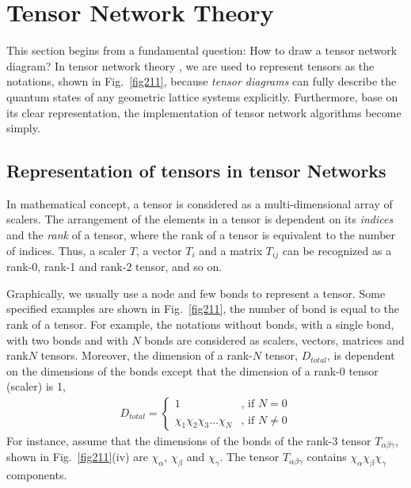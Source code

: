 \chapter{Tensor Network Theory} 
This section begins from a fundamental question: How to draw a tensor network diagram? In tensor network theory \cite{jordan_studies_2011} \cite{Orus2014117} \cite{bauer_tensor_2011}, we are used to represent tensors as the notations, shown in Fig.~\ref{fig211}, because \textit{tensor diagrams} can fully describe the quantum states of any geometric lattice systems explicitly. Furthermore, base on its clear representation, the implementation of tensor network algorithms become simply. 

\section{Representation of tensors in tensor Networks}
\label{notations}
In mathematical concept, a tensor is considered as a multi-dimensional array of scalers. The arrangement of the elements in a tensor is dependent on its \textit{indices} and the \textit{rank} of a tensor, where the rank of a tensor is equivalent to the number of indices. Thus, a scaler $T$, a vector $T_{i}$ and a matrix $T_{ij}$ can be recognized as a rank-0, rank-1 and rank-2 tensor, and so on. 

Graphically, we usually use a node and few bonds to represent a tensor. Some specified examples are shown in Fig.~\ref{fig211}, the number of bond is equal to the rank of a tensor. For example, the notations without bonds, with a single bond, with two bonds and with $N$ bonds are considered as scalers, vectors, matrices and rank$N$ tensors. Moreover, the dimension of a rank-$N$ tensor, $D_{total}$, is dependent on the dimensions of the bonds except that the dimension of a rank-0 tensor (scaler) is 1,
\begin{align}
	D_{total} = \begin{cases}
		1 & \text{, if $N = 0$} \\
		\chi_{1}\chi_{2}\chi_{3} \dots \chi_{N} & \text{, if $N \neq 0$}
	\end{cases}
\end{align}
For instance, assume that the dimensions of the bonds of the rank-3 tensor $T_{\alpha \beta \gamma}$, shown in Fig.~\ref{fig211}(iv) are $\chi_{\alpha}$, $\chi_{\beta}$ and $\chi_{\gamma}$. The tensor $T_{\alpha \beta \gamma}$ contains $\chi_{\alpha}$$\chi_{\beta}$$\chi_{\gamma}$ components.

